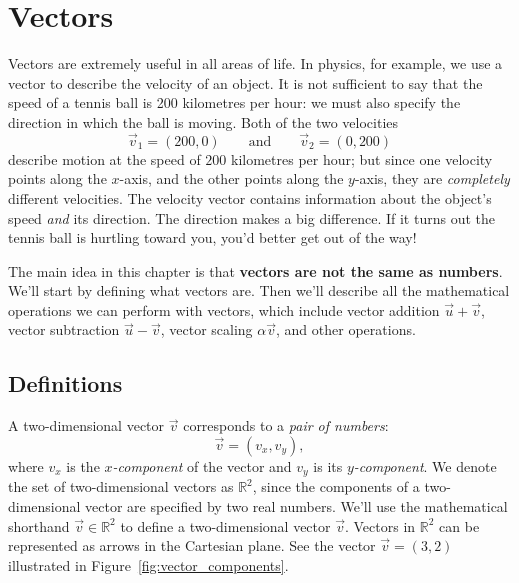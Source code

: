 
\section{Vectors}
\label{sec:vectors}

	Vectors are extremely useful in all areas of life.
	In physics, for example, we use a vector to describe the velocity of an object.
	It is not sufficient to say that the speed of a tennis ball is 200 kilometres per hour:
	we must also specify the direction in which the ball is moving.
	Both of the two velocities 
	\[
	 \vec{v}_1 = (200,0) 
	 \qquad \textrm{and}
	 \qquad \vec{v}_2=(0,200)
	\]
	describe motion at the speed of $200$ kilometres per hour;
	but since one velocity points along the $x$-axis, and the other points along the $y$-axis,
	they are \emph{completely} different velocities. 
	The velocity vector contains information about the object's speed \emph{and} its direction.
	The direction makes a big difference.
	If it turns out the tennis ball is hurtling toward you, you'd better get out of the way!

	The main idea in this chapter is that \textbf{vectors are not the same as numbers}.
	We'll start by defining what vectors are.
	Then we'll describe all the mathematical operations we can perform with vectors,
	which include
		vector addition $\vec{u}+\vec{v}$, 
		vector subtraction $\vec{u}-\vec{v}$,
		vector scaling $\alpha\vec{v}$,
		and other operations.


	\subsection{Definitions}
	\label{vectors:definitions}

		A two-dimensional vector $\vec{v}$ corresponds to a \emph{pair of numbers}:
		\[
			\vec{v} = (v_x, v_y),
		\]
		where $v_x$ is the \emph{$x$-component} of the vector and $v_y$ is its \emph{$y$-component}.					
		We denote the set of two-dimensional vectors as $\mathbb{R}^2$,
		since the components of a two-dimensional vector are specified by two real numbers.
		We'll use the mathematical shorthand $\vec{v} \in \mathbb{R}^2$ to define a two-dimensional vector $\vec{v}$.
		Vectors in $\mathbb{R}^2$ can be represented as arrows in the Cartesian plane.
		See the vector $\vec{v}=(3,2)$ illustrated in Figure~\ref{fig:vector_components}.

